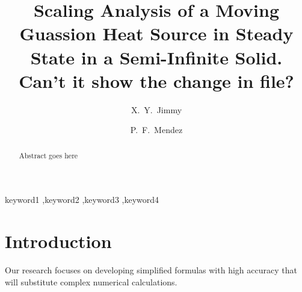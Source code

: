 \documentclass[review, 1p, number, sort&compress,table]{elsarticle}
\begin{document}
	\begin{frontmatter}
		\title{Scaling Analysis of a Moving Guassion Heat Source in Steady State in a Semi-Infinite Solid. Can't it show the change in file?}
		
		\author[UoA]{X.~Y.~Jimmy}
		
		\author[UoA]{P.~F.~Mendez}
		
		
		\address[UoA]{Department of Chemical and Materials Engineering, University of Alberta, Edmonton, Alberta,T6G 2V4, Canada}
	
		\begin{abstract}
			Abstract goes here
		\end{abstract}
		
		\begin{keyword}
			keyword1 \sep keyword2 \sep keyword3 \sep keyword4
		\end{keyword}

	\end{frontmatter}
	

	\section{Introduction}
		\indent 
		Our research focuses on developing simplified formulas with high accuracy that will substitute complex numerical calculations. 
		      
\end{document}
